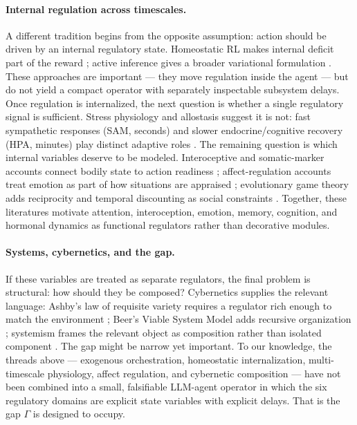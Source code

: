 \documentclass{article}
\begin{document}
\paragraph{Internal regulation across timescales.} A different tradition begins from the opposite assumption: action should be driven by an internal regulatory state. Homeostatic RL makes internal deficit part of the reward \citep{keramati2014homeostatic}; active inference gives a broader variational formulation \citep{friston2017active,parr2022active}. These approaches are important --- they move regulation inside the agent --- but do not yield a compact operator with separately inspectable subsystem delays. Once regulation is internalized, the next question is whether a single regulatory signal is sufficient. Stress physiology and allostasis suggest it is not: fast sympathetic responses (SAM, seconds) and slower endocrine/cognitive recovery (HPA, minutes) play distinct adaptive roles \citep{sterling1988allostasis,mcewen2007physiology,kirschbaum1993cortisol}. The remaining question is which internal variables deserve to be modeled. Interoceptive and somatic-marker accounts connect bodily state to action readiness \citep{damasio1994descartes,craig2009you}; affect-regulation accounts treat emotion as part of how situations are appraised \citep{barrett2017how,ledoux2012rethinking}; evolutionary game theory adds reciprocity and temporal discounting as social constraints \citep{nowak2006evolutionary,henrich2005foundations}. Together, these literatures motivate attention, interoception, emotion, memory, cognition, and hormonal dynamics as functional regulators rather than decorative modules.

\paragraph{Systems, cybernetics, and the gap.} If these variables are treated as separate regulators, the final problem is structural: how should they be composed? Cybernetics supplies the relevant language: Ashby's law of requisite variety requires a regulator rich enough to match the environment \citep{ashby1956introduction}; Beer's Viable System Model adds recursive organization \citep{beer1972brain}; systemism frames the relevant object as composition rather than isolated component \citep{bunge2003emergence,romero2018scientific}. The gap might be narrow yet important. To our knowledge, the threads above --- exogenous orchestration, homeostatic internalization, multi-timescale physiology, affect regulation, and cybernetic composition --- have not been combined into a small, falsifiable LLM-agent operator in which the six regulatory domains are explicit state variables with explicit delays. That is the gap $\Gamma$ is designed to occupy.
\end{document}
